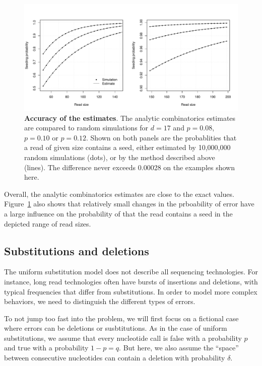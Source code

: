 \documentclass{article}
\begin{document}
\begin{figure}[h]
\centering
\includegraphics[scale=0.445]{simulp.pdf}
\caption{\textbf{Accuracy of the estimates}. The analytic combinatorics
estimates are compared to random simulations for $d=17$ and $p=0.08$,
$p=0.10$ or $p=0.12$. Shown on both panels are the probablities that a
read of given size contains a seed, either estimated by 10,000,000 random
simulations (dots), or by the method described above (lines). The
difference never exceeds 0.00028 on the examples shown here.}
\label{fig:simulp}
\end{figure}

Overall, the analytic combinatorics estimates are close to the exact
values. Figure~\ref{fig:simulp} also shows that relatively small changes
in the prboability of error have a large influence on the probability of
that the read contains a seed in the depicted range of read sizes.




\subsection{Substitutions and deletions}
\label{sec:deletions}

The uniform substitution model does not describe all sequencing
technologies. For instance, long read technologies often have bursts of
insertions and deletions, with typical frequencies that differ from
substitutions. In order to model more complex behaviors, we need to
distinguish the different types of errors.

To not jump too fast into the problem, we will first focus on a fictional
case where errors can be deletions or susbtitutions. As in the case of
uniform substitutions, we assume that every nucleotide call is false with
a probability $p$ and true with a probability $1-p=q$. But here, we also
assume the ``space''  between consecutive nucleotides can contain a
deletion with probability $\delta$.
\end{document}
